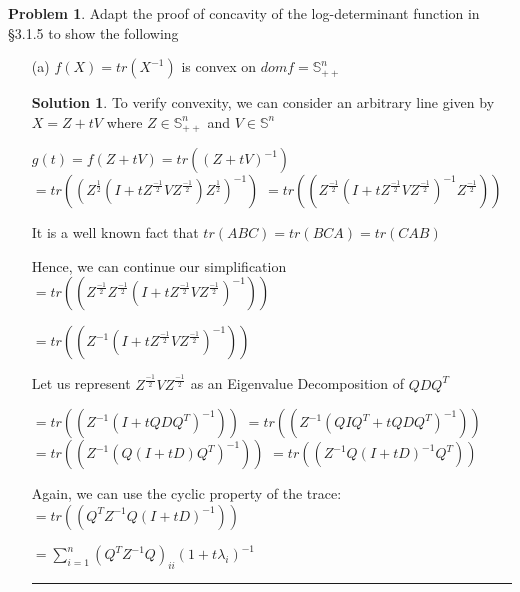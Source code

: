 \documentclass{article}
\theoremstyle{definition}
\newtheorem{problem}{Problem}
\def\fline{\rule{0.75\linewidth}{0.5pt}}
\newcommand{\finishline}{\begin{center}\fline\end{center}}
\newtheorem*{solution*}{Solution}
\newenvironment{solution}{\begin{solution*}}{{\finishline} \end{solution*}}
\begin{document}
\begin{problem}
    Adapt the proof of concavity of the log-determinant function in §3.1.5 to show the following
    \begin{itemize}
        \item[(a)] $f(X) = tr(X^{-1})$ is convex on $dom f = \mathbb{S}^n_{++}$
        \begin{solution}
            To verify convexity, we can consider an arbitrary line given by $X = Z + tV$ where $Z \in \mathbb{S}^n_{++}$ and $V \in \mathbb{S}^n$

            $g(t) = f(Z + tV) = tr((Z + tV)^{-1})$ \newline 
            $= tr((Z^{\frac{1}{2}} (I + tZ^{\frac{-1}{2}} V Z^{\frac{-1}{2}}) Z^{\frac{1}{2}})^{-1})$ \newline 
            $= tr((Z^{\frac{-1}{2}} (I + tZ^{\frac{-1}{2}} V Z^{\frac{-1}{2}})^{-1} Z^{\frac{-1}{2}}))$ \newline 

            It is a well known fact that $tr(ABC) = tr(BCA) = tr(CAB)$ \newline 

            Hence, we can continue our simplification \newline 
            $= tr((Z^{\frac{-1}{2}} Z^{\frac{-1}{2}} (I + tZ^{\frac{-1}{2}} V Z^{\frac{-1}{2}})^{-1}))$ \newline 

            $= tr((Z^{-1} (I + tZ^{\frac{-1}{2}} V Z^{\frac{-1}{2}})^{-1}))$ \newline 

            Let us represent $Z^{\frac{-1}{2}} V Z^{\frac{-1}{2}}$ as an Eigenvalue Decomposition of $QDQ^T$ \newline 
            
            $= tr((Z^{-1} (I + tQDQ^T)^{-1}))$ \newline 
            $= tr((Z^{-1} (QIQ^T + tQDQ^T)^{-1}))$ \newline 
            $= tr((Z^{-1} (Q(I + tD)Q^T)^{-1}))$ \newline 
            $= tr((Z^{-1} Q (I + tD)^{-1} Q^T))$ \newline 

            Again, we can use the cyclic property of the trace: \newline 
            $= tr((Q^TZ^{-1} Q (I + tD)^{-1}))$ \newline 

            $= \sum_{i=1}^{n} (Q^TZ^{-1} Q)_{ii} (1 + t\lambda_i)^{-1}$


\end{solution}
\end{itemize}
\end{problem}
\end{document}
